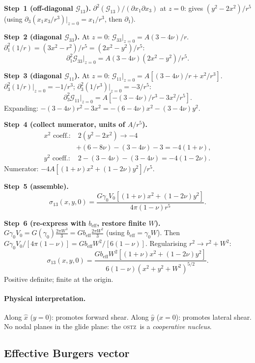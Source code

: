 \documentclass[5p,sort&compress]{elsarticle}
\newcommand{\OSTZ}{\textsc{ostz}}
\newcommand{\gz}{\gamma_0}
\newcommand{\beff}{b_\mathrm{eff}}
\begin{document}
\textbf{Step~1 (off-diagonal $\mathcal G_{13}$).}
$\partial^2(\mathcal G_{13})/(\partial x_1\partial x_3)$ at $z=0$:
gives $(y^2-2x^2)/r^5$ (using $\partial_3(x_1x_3/r^3)|_{z=0}
=x_1/r^3$, then $\partial_1$).

\textbf{Step~2 (diagonal $\mathcal G_{33}$).}
At $z=0$: $\mathcal G_{33}|_{z=0}=A(3-4\nu)/r$.
$\partial_1^2(1/r)=(3x^2-r^2)/r^5=(2x^2-y^2)/r^5$:
\[
  \partial_1^2\mathcal G_{33}\big|_{z=0}=A(3-4\nu)(2x^2-y^2)/r^5.
\]

\textbf{Step~3 (diagonal $\mathcal G_{11}$).}
At $z=0$: $\mathcal G_{11}|_{z=0}=A[(3-4\nu)/r+x^2/r^3]$.
$\partial_3^2(1/r)|_{z=0}=-1/r^3$;
$\partial_3^2(1/r^3)|_{z=0}=-3/r^5$:
\[
  \partial_3^2\mathcal G_{11}\big|_{z=0}=A[-(3-4\nu)/r^3-3x^2/r^5].
\]
Expanding: $-(3-4\nu)r^2-3x^2=-(6-4\nu)x^2-(3-4\nu)y^2$.

\textbf{Step~4 (collect numerator, units of $A/r^5$).}
\begin{align*}
  x^2\text{ coeff.:}&\;2(y^2\!-\!2x^2)\to-4\\
  &+(6\!-\!8\nu)-(3\!-\!4\nu)-3=-4(1+\nu),\\
  y^2\text{ coeff.:}&\;2-(3\!-\!4\nu)-(3\!-\!4\nu)=-4(1-2\nu).
\end{align*}
Numerator: $-4A[(1+\nu)x^2+(1-2\nu)y^2]/r^5$.

\textbf{Step~5 (assemble).}
\[
  \sigma_{13}(x,y,0)=\frac{G\gz V_0[(1+\nu)x^2+(1-2\nu)y^2]}
  {4\pi(1-\nu)r^5}.
\]

\textbf{Step~6 (re-express with $\beff$, restore finite $W$).}
$G\gz V_0=G(\gz)\tfrac{2\pi W^3}{3}=G\beff\tfrac{2\pi W^2}{3}$
(using $\beff=\gz W$). Then $G\gz V_0/[4\pi(1-\nu)]=G\beff W^2/[6(1-\nu)]$.
Regularising $r^2\to r^2+W^2$:
\begin{equation}
  \boxed{\sigma_{13}(x,y,0)=
  \frac{G\beff W^2[(1+\nu)x^2+(1-2\nu)y^2]}
  {6(1-\nu)(x^2+y^2+W^2)^{5/2}}.}
  \label{eq:glideplane}
\end{equation}
Positive definite; finite at the origin.

\paragraph{Physical interpretation.}
Along $\hat x$ ($y=0$): promotes forward shear.
Along $\hat y$ ($x=0$): promotes lateral shear.
No nodal planes in the glide plane: the \OSTZ\ is a
\emph{cooperative nucleus}.

\subsection{Effective Burgers vector}
\label{sec:beff}
\end{document}
